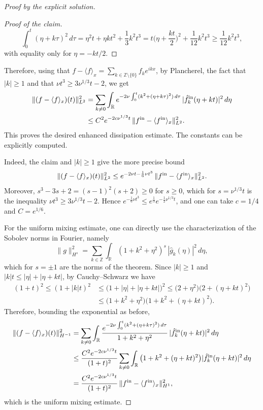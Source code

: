 \documentclass[11pt]{article}
\makeatletter
\theoremstyle{definition}
\theoremstyle{remark}
\newenvironment{note}[1][Note]{\begin{tcolorbox}[ed@note]\noindent{\itshape#1\@addpunct{.}}\enspace\ignorespaces}{\end{tcolorbox}}
\makeatother
\begin{document}
\begin{proof}[Proof by the explicit solution]
\begin{proof}[Proof of the claim]
\[\int_0^t(\eta+k\tau)^2\,d\tau=\eta^2t+\eta kt^2+\frac{1}{3}k^2t^3=t\Big(\eta+\frac{kt}{2}\Big)^2+\frac{1}{12}k^2t^3\geq\frac{1}{12}k^2t^3,\]
with equality only for $\eta=-kt/2$.
\end{proof}
Therefore, using that $f-\langle f\rangle_x=\sum_{k\in\mathbb{Z}\setminus\{0\}}f_ke^{ikx}$, by Plancherel, the fact that $|k|\geq1$ and that $\nu t^3\geq3\nu^{1/3}t-2$, we get
\[\begin{aligned}\|(f-\langle f\rangle_x)(t)\|_{L^2}^2&=\sum_{k\neq0}\int_{\mathbb{R}}e^{-2\nu\int_0^t(k^2+(\eta+k\tau)^2)\,d\tau}\,|\hat f^{\rm in}_k(\eta+kt)|^2\,d\eta\\&\leq C^2e^{-2c\nu^{1/3}t}\,\|f^{\rm in}-\langle f^{\rm in}\rangle_x\|_{L^2}^2.\end{aligned}\]
This proves the desired enhanced dissipation estimate. The constants can be explicitly computed.
\begin{note}[The constants]
Indeed, the claim and $|k|\geq1$ give the more precise bound
\[\|(f-\langle f\rangle_x)(t)\|_{L^2}^2\leq e^{-2\nu t-\frac{1}{6}\nu t^3}\,\|f^{\rm in}-\langle f^{\rm in}\rangle_x\|_{L^2}^2.\]
Moreover, $s^3-3s+2=(s-1)^2(s+2)\geq0$ for $s\geq0$, which for $s=\nu^{1/3}t$ is the inequality $\nu t^3\geq3\nu^{1/3}t-2$. Hence $e^{-\frac{1}{6}\nu t^3}\leq e^{\frac{1}{3}}e^{-\frac{1}{2}\nu^{1/3}t}$, and one can take $c=1/4$ and $C=e^{1/6}$.
\end{note}

For the uniform mixing estimate, one can directly use the characterization of the Sobolev norms in Fourier, namely
\[\|g\|_{H^{s}}^2=\sum_{k\in\mathbb{Z}}\int_{\mathbb{R}}(1+k^2+\eta^2)^{s}\,|\hat g_k(\eta)|^2\,d\eta,\]
which for $s=\pm1$ are the norms of the theorem. Since $|k|\geq1$ and $|k|t\leq|\eta|+|\eta+kt|$, by Cauchy–Schwarz we have
\[\begin{aligned}(1+t)^2\leq(1+|k|t)^2&\leq\big(1+|\eta|+|\eta+kt|\big)^2\leq\big(2+\eta^2\big)\big(2+(\eta+kt)^2\big)\\&\leq\big(1+k^2+\eta^2\big)\big(1+k^2+(\eta+kt)^2\big).\end{aligned}\]
Therefore, bounding the exponential as before,
\[\begin{aligned}\|(f-\langle f\rangle_x)(t)\|_{H^{-1}}^2&=\sum_{k\neq0}\int_{\mathbb{R}}\frac{e^{-2\nu\int_0^t(k^2+(\eta+k\tau)^2)\,d\tau}}{1+k^2+\eta^2}\,|\hat f^{\rm in}_k(\eta+kt)|^2\,d\eta\\&\leq\frac{C^2e^{-2c\nu^{1/3}t}}{(1+t)^2}\sum_{k\neq0}\int_{\mathbb{R}}\big(1+k^2+(\eta+kt)^2\big)|\hat f^{\rm in}_k(\eta+kt)|^2\,d\eta\\&=\frac{C^2e^{-2c\nu^{1/3}t}}{(1+t)^2}\,\|f^{\rm in}-\langle f^{\rm in}\rangle_x\|_{H^1}^2,\end{aligned}\]
which is the uniform mixing estimate.


\end{proof}
\end{document}

